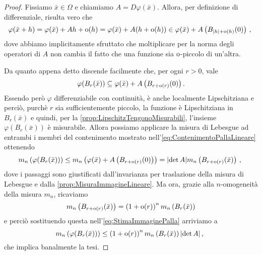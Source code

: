 \begin{proof}
	Fissiamo $\bar x\in\Omega$ e chiamiamo $A=D \varphi(\bar x)$.
	Allora, per definizione di differenziale, risulta vero che
	\begin{equation*}
		\varphi(\bar x+h)=\varphi(\bar x)+Ah+\mathrm{o}(h)=\varphi(\bar x)+A(h+\mathrm{o}(h))\in \varphi(\bar x)+A\left(B_{|h|+\mathrm{o}(h)}(0)\right) \, \text{, }
	\end{equation*}
	dove abbiamo implicitamente sfruttato che moltiplicare per la norma degli operatori di $A$ non cambia il fatto che una funzione sia $\mathrm{o}$-piccolo di un'altra.
	
	Da quanto appena detto discende facilmente che, per ogni $r>0$, vale
	\begin{equation}\label{eq:ContenimentoPallaLineare}
		\varphi(B_r(\bar x))\subseteq \varphi(\bar x)+A\left(B_{r+\mathrm{o}(r)}(0)\right).
	\end{equation}
	Essendo però $\varphi$ differenziabile con continuità, è anche localmente Lipschitziana e perciò, purchè $r$ sia sufficientemente piccolo, la funzione è Lipschitziana in $B_r(\bar x)$ e quindi, per la \cref{prop:LipschitzTengonoMisurabili}, l'insieme $\varphi(B_r(\bar x))$ è misurabile.
	Allora possiamo applicare la misura di Lebesgue ad entrambi i membri del contenimento mostrato nell'\cref{eq:ContenimentoPallaLineare} ottenendo
	\begin{equation}\label{eq:StimaImmaginePalla}
		m_n\left( \varphi(B_r(\bar x)) \right)\le m_n\left(\varphi(\bar x)+A\left(B_{r+\mathrm{o}(r)}(0)\right)\right)
		=\lvert \det A\rvert m_n\left(B_{r+\mathrm{o}(r)}(\bar x)\right)\, \text{, }
	\end{equation}
	dove i passaggi sono giustificati dall'invarianza per traslazione della misura di Lebesgue e dalla \cref{prop:MisuraImmagineLineare}.
	Ma ora, grazie alla $n$-omogeneità della misura $m_n$, ricaviamo
	\begin{equation*} 
		m_n\left(B_{r+\mathrm{o}(r)}(\bar x)\right)=\left(1+\mathrm{o}(r)\right)^n m_n\left( B_r(\bar x)\right)
	\end{equation*}
	e perciò sostituendo questa nell'\cref{eq:StimaImmaginePalla} arriviamo a
	\begin{equation*}
		m_n\left( \varphi(B_r(\bar x)) \right)\le \left(1+\mathrm{o}(r)\right)^n m_n\left( B_r(\bar x)\right)\lvert \det A\rvert \, \text{, }
	\end{equation*}
	che implica banalmente la tesi.
\end{proof}

